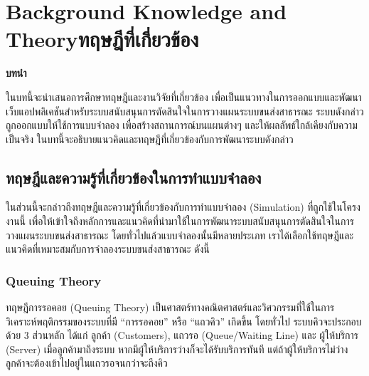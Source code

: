 \chapter{\ifenglish Background Knowledge and Theory\else ทฤษฎีที่เกี่ยวข้อง\fi}

\textbf{บทนำ}
\begin{mypara}
\indent ในบทนี้จะนำเสนอการศึกษาทฤษฎีและงานวิจัยที่เกี่ยวข้อง เพื่อเป็นแนวทางในการออกแบบและพัฒนาเว็บแอปพลิเคชันสำหรับระบบสนับสนุนการตัดสินใจในการวางแผนระบบขนส่งสาธารณะ 
    ระบบดังกล่าวถูกออกแบบให้ใช้การแบบจำลอง เพื่อสร้างสถานการณ์บนแผนต่างๆ 
    และให้ผลลัพธ์ใกล้เคียงกับความเป็นจริง ในบทนี้จะอธิบายแนวคิดและทฤษฎีที่เกี่ยวข้องกับการพัฒนาระบบดังกล่าว 
\end{mypara}

\section{ทฤษฎีและความรู้ที่เกี่ยวข้องในการทำแบบจำลอง}
    \begin{mypara}
        \indent ในส่วนนี้จะกล่าวถึงทฤษฎีและความรู้ที่เกี่ยวข้องกับการทำแบบจำลอง (Simulation) ที่ถูกใช้ในโครงงานนี้
        เพื่อให้เข้าใจถึงหลักการและแนวคิดที่นำมาใช้ในการพัฒนาระบบสนับสนุนการตัดสินใจในการวางแผนระบบขนส่งสาธารณะ
        โดยทั่วไปแล้วแบบจำลองนั้นมีหลายประเภท เราได้เลือกใช้ทฤษฎีและแนวคิดที่เหมาะสมกับการจำลองระบบขนส่งสาธารณะ ดังนี้
    \end{mypara}

\subsection{Queuing Theory}
\begin{mypara}
    \indent ทฤษฎีการรอคอย (Queuing Theory) เป็นศาสตร์ทางคณิตศาสตร์และวิศวกรรมที่ใช้ในการวิเคราะห์พฤติกรรมของระบบที่มี 
    “การรอคอย” หรือ “แถวคิว” เกิดขึ้น โดยทั่วไป ระบบคิวจะประกอบด้วย 3 ส่วนหลัก ได้แก่ ลูกค้า (Customers), 
    แถวรอ (Queue/Waiting Line) และ ผู้ให้บริการ (Server) เมื่อลูกค้ามาถึงระบบ หากมีผู้ให้บริการว่างก็จะได้รับบริการทันที 
    แต่ถ้าผู้ให้บริการไม่ว่าง ลูกค้าจะต้องเข้าไปอยู่ในแถวรอจนกว่าจะถึงคิว
\end{mypara}

